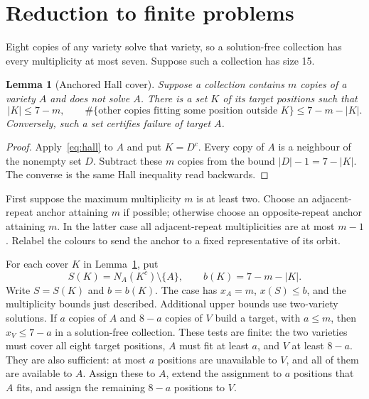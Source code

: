 \documentclass[11pt]{article}
\newtheorem{lemma}[theorem]{Lemma}
\theoremstyle{remark}
\begin{document}
\section{Reduction to finite problems}\label{sec:cases}
Eight copies of any variety solve that variety, so a solution-free collection
has every multiplicity at most seven. Suppose such a collection has size 15.

\begin{lemma}[Anchored Hall cover]\label{lem:anchor}
Suppose a collection contains $m$ copies of a variety $A$ and does not solve
$A$. There is a set $K$ of its target positions such that
\begin{equation}\label{eq:anchor}
 |K|\le 7-m,\qquad
 \#\{\text{other copies fitting some position outside }K\}
       \le 7-m-|K|.
\end{equation}
Conversely, such a set certifies failure of target $A$.
\end{lemma}
\begin{proof}
Apply~\eqref{eq:hall} to $A$ and put $K=D^c$. Every copy of $A$ is a
neighbour of the nonempty set $D$. Subtract these $m$ copies from the bound
$|D|-1=7-|K|$. The converse is the same Hall inequality read backwards.
\end{proof}

First suppose the maximum multiplicity $m$ is at least two. Choose an
adjacent-repeat anchor attaining $m$ if possible; otherwise choose an
opposite-repeat anchor attaining $m$. In the latter case all adjacent-repeat
multiplicities are at most $m-1$. Relabel the colours to send the anchor to
a fixed representative of its orbit.

For each cover $K$ in Lemma~\ref{lem:anchor}, put
\[
 S(K)=N_A(K^c)\setminus\{A\},\qquad b(K)=7-m-|K|.
\]
Write $S=S(K)$ and $b=b(K)$. The case has
$x_A=m$, $x(S)\le b$, and the multiplicity bounds just described.
Additional upper bounds use two-variety solutions. If $a$ copies of $A$
and $8-a$ copies of $V$ build a target, with $a\le m$, then
$x_V\le 7-a$ in a solution-free collection. These tests are finite:
the two varieties must cover all eight target positions, $A$ must fit at
least $a$, and $V$ at least $8-a$. They are also sufficient: at most $a$
positions are unavailable to $V$,
and all of them are available to $A$. Assign these to $A$, extend the
assignment to $a$ positions that $A$ fits, and assign the remaining
$8-a$ positions to $V$.
\end{document}
